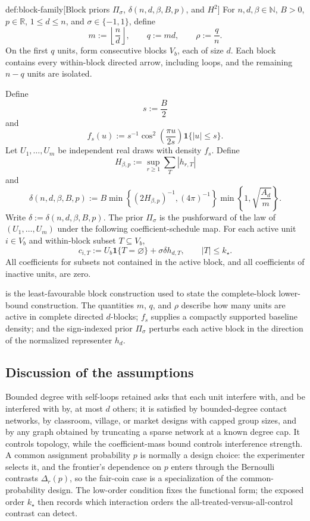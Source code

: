 \begin{definitionv}{def:block-family}[Block priors \(\Pi_\sigma\), \(\delta(n,d,\beta,B,p)\), and \(H^2\)]
For \(n,d,\beta\in\mathbb N\), \(B>0\), \(p\in\mathbb R\), \(1\le d\le n\), and \(\sigma\in\{-1,1\}\), define
\[
m:=\left\lfloor \frac nd\right\rfloor,
\qquad
q:=md,
\qquad
\rho:=\frac qn .
\]
On the first \(q\) units, form consecutive blocks \(V_b\), each of size \(d\). Each block contains every within-block directed arrow, including loops, and the remaining \(n-q\) units are isolated.

Define
\[
s:=\frac B2
\]
and
\[
f_s(u):=
s^{-1}\cos^2\left(\frac{\pi u}{2s}\right)\mathbf 1\{|u|\le s\}.
\]
Let \(U_1,\ldots,U_m\) be independent real draws with density \(f_s\). Define
\[
H_{\beta,p}:=
\sup_{r\ge 1}\sum_T |h_{r,T}|
\]
and
\[
\delta(n,d,\beta,B,p)
:=
B\min\left\{(2H_{\beta,p})^{-1},(4\pi)^{-1}\right\}
\min\left\{1,\sqrt{\frac{A_d}{m}}\right\}.
\]
Write \(\delta:=\delta(n,d,\beta,B,p)\). The prior \(\Pi_\sigma\) is the pushforward of the law of \((U_1,\ldots,U_m)\) under the following coefficient-schedule map. For each active unit \(i\in V_b\) and within-block subset \(T\subseteq V_b\),
\[
c_{i,T}
:=
U_b\mathbf 1\{T=\varnothing\}
+\sigma\delta h_{d,T},
\qquad |T|\le k_\star .
\]
All coefficients for subsets not contained in the active block, and all coefficients of inactive units, are zero.
\end{definitionv}

 is the least-favourable block construction used to state the complete-block lower-bound construction. The quantities \(m\), \(q\), and \(\rho\) describe how many units are active in complete directed \(d\)-blocks; \(f_s\) supplies a compactly supported baseline density; and the sign-indexed prior \(\Pi_\sigma\) perturbs each active block in the direction of the normalized representer \(h_d\).

\subsection{Discussion of the assumptions}

Bounded degree with self-loops retained asks that each unit interfere with, and be interfered
with by, at most \(d\) others; it is satisfied by bounded-degree contact networks, by
classroom, village, or market designs with capped group sizes, and by any graph obtained by
truncating a sparse network at a known degree cap. It controls topology, while the
coefficient-mass bound controls interference strength. A common assignment probability
\(p\) is normally a design choice: the experimenter selects it, and the frontier's
dependence on \(p\) enters through the Bernoulli contrasts \(\Delta_r(p)\), so the fair-coin
case is a specialization of the common-probability design. The low-order condition fixes
the functional form; the exposed order \(k_\star\) then records which interaction orders the
all-treated-versus-all-control contrast can detect.
